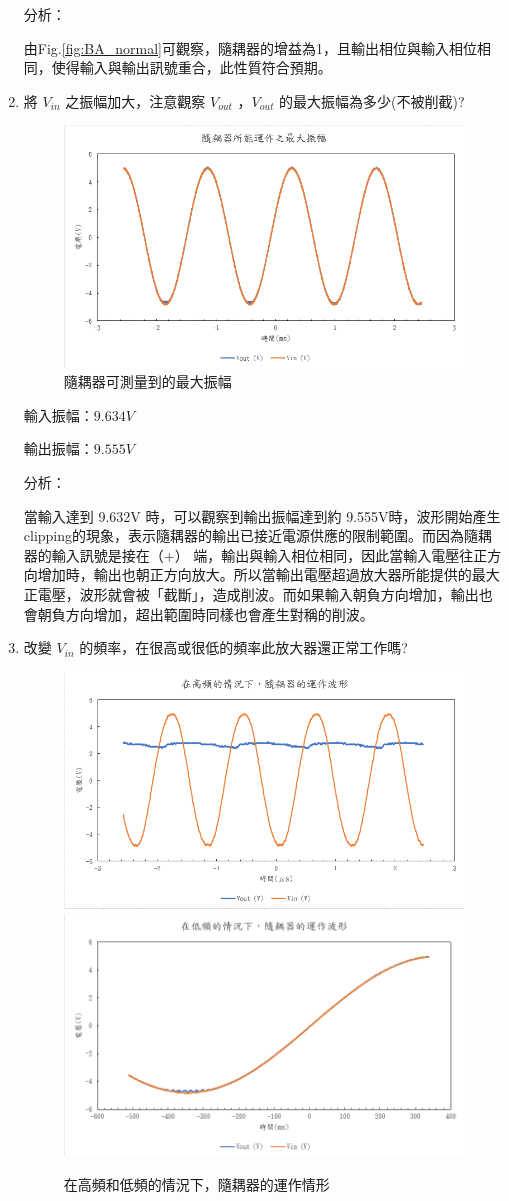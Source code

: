 \documentclass[12pt,a4paper]{article}
\begin{document}
\begin{CJK}{UTF8}{bkai}
\begin{enumerate}
\noindent 分析：

由Fig.\ref{fig:BA_normal}可觀察，隨耦器的增益為1，且輸出相位與輸入相位相同，使得輸入與輸出訊號重合，此性質符合預期。

\item 將 $V_{in}$ 之振幅加大，注意觀察 $V_{out}$ ，$V_{out}$ 的最大振幅為多少(不被削截)?
\begin{figure}[h]
    \centering
    \includegraphics[width=0.7\linewidth]{figures/Buffer amplifier/Buffer amplifier_max.png}
    \caption{隨耦器可測量到的最大振幅}
    \label{fig:BA_Max}
\end{figure}

輸入振幅：$9.634V$

輸出振幅：$9.555V$

\noindent 分析：

當輸入達到 9.632V 時，可以觀察到輸出振幅達到約 9.555V時，波形開始產生clipping的現象，表示隨耦器的輸出已接近電源供應的限制範圍。而因為隨耦器的輸入訊號是接在（+） 端，輸出與輸入相位相同，因此當輸入電壓往正方向增加時，輸出也朝正方向放大。所以當輸出電壓超過放大器所能提供的最大正電壓，波形就會被「截斷」，造成削波。而如果輸入朝負方向增加，輸出也會朝負方向增加，超出範圍時同樣也會產生對稱的削波。


\item 改變 $V_{in}$ 的頻率，在很高或很低的頻率此放大器還正常工作嗎?

\begin{figure}[h]
    \centering
    \includegraphics[width=0.45\linewidth]{figures/Buffer amplifier/Buffer amplifier_high freq.png}
    \includegraphics[width=0.45\linewidth]{figures/Buffer amplifier/Buffer amplifier_low freq.png}
    \caption{在高頻和低頻的情況下，隨耦器的運作情形}
    \label{fig:BA_freq}
\end{figure}


\end{enumerate}
\end{CJK}
\end{document}
